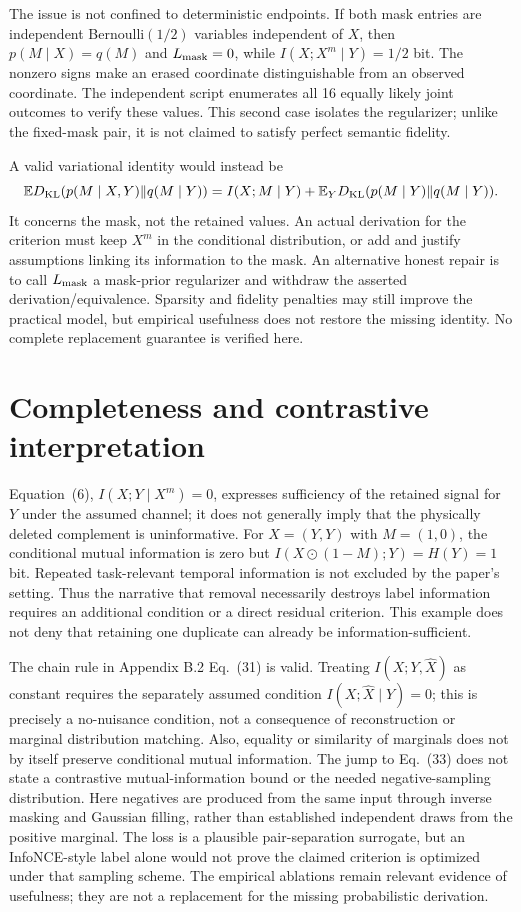 \documentclass[10pt]{article}
\begin{document}
The issue is not confined to deterministic endpoints. If both mask entries are independent Bernoulli\((1/2)\) variables independent of \(X\), then \(p(M\mid X)=q(M)\) and \(L_{\rm mask}=0\), while \(I(X;X^m\mid Y)=1/2\) bit. The nonzero signs make an erased coordinate distinguishable from an observed coordinate. The independent script enumerates all 16 equally likely joint outcomes to verify these values. This second case isolates the regularizer; unlike the fixed-mask pair, it is not claimed to satisfy perfect semantic fidelity.\par
A valid variational identity would instead be \[\mathbb E D_{\rm KL}(p(M\mid X,Y)\Vert q(M\mid Y))
=I(X;M\mid Y)+\mathbb E_YD_{\rm KL}(p(M\mid Y)\Vert q(M\mid Y)).\] It concerns the mask, not the retained values. An actual derivation for the criterion must keep \(X^m\) in the conditional distribution, or add and justify assumptions linking its information to the mask. An alternative honest repair is to call \(L_{\rm mask}\) a mask-prior regularizer and withdraw the asserted derivation/equivalence. Sparsity and fidelity penalties may still improve the practical model, but empirical usefulness does not restore the missing identity. No complete replacement guarantee is verified here.\par
\section*{Completeness and contrastive interpretation}
Equation (6), \(I(X;Y\mid X^m)=0\), expresses sufficiency of the retained signal for \(Y\) under the assumed channel; it does not generally imply that the physically deleted complement is uninformative. For \(X=(Y,Y)\) with \(M=(1,0)\), the conditional mutual information is zero but \(I(X\odot(1-M);Y)=H(Y)=1\) bit. Repeated task-relevant temporal information is not excluded by the paper’s setting. Thus the narrative that removal necessarily destroys label information requires an additional condition or a direct residual criterion. This example does not deny that retaining one duplicate can already be information-sufficient.\par
The chain rule in Appendix B.2 Eq. (31) is valid. Treating \(I(X;Y,\widehat X)\) as constant requires the separately assumed condition \(I(X;\widehat X\mid Y)=0\); this is precisely a no-nuisance condition, not a consequence of reconstruction or marginal distribution matching. Also, equality or similarity of marginals does not by itself preserve conditional mutual information. The jump to Eq. (33) does not state a contrastive mutual-information bound or the needed negative-sampling distribution. Here negatives are produced from the same input through inverse masking and Gaussian filling, rather than established independent draws from the positive marginal. The loss is a plausible pair-separation surrogate, but an InfoNCE-style label alone would not prove the claimed criterion is optimized under that sampling scheme. The empirical ablations remain relevant evidence of usefulness; they are not a replacement for the missing probabilistic derivation.\par
\end{document}
